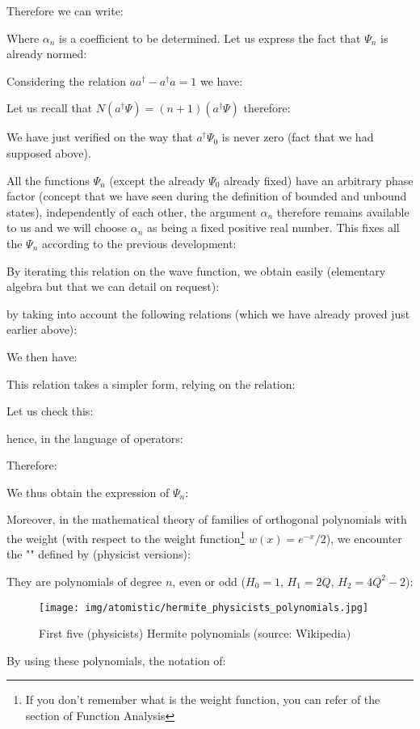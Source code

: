	Therefore we can write:
	
	Where $\alpha_n$ is a coefficient to be determined. Let us express the fact that $\Psi_n$ is already normed:
	
	Considering the relation $aa^\dagger-a^\dagger a=1$ we have:
	
	Let us recall that $N(a^\dagger\Psi)=(n+1)(a^\dagger\Psi)$ therefore:
	
	We have just verified on the way that $a^\dagger\Psi_0$ is never zero (fact that we had supposed above).

	All the functions $\Psi_n$ (except the already $\Psi_0$ already fixed) have an arbitrary phase factor (concept that we have seen during the definition of bounded and unbound states), independently of each other, the argument $\alpha_n$ therefore remains available to us and we will choose $\alpha_n$ as being a fixed positive real number. This fixes all the $\Psi_n$ according to the previous development:
	
	By iterating this relation on the wave function, we obtain easily (elementary algebra but that we can detail on request):
	
	by taking into account the following relations (which we have already proved just earlier above):
	
	We then have:
	
	This relation takes a simpler form, relying on the relation:
	
	Let us check this:
	
	hence, in the language of operators:
	
	Therefore:
	
	We thus obtain the expression of $\Psi_n$:
	
	Moreover, in the mathematical theory of families of orthogonal polynomials with the weight (with respect to the weight function\footnote{If you don't remember what is the weight function, you can refer of the section of Function Analysis} $w(x)=e^{-x}/2$), we encounter the "" defined by (physicist versions):
	
	They are polynomials of degree $n$, even or odd ($H_0=1$, $H_1=2Q$, $H_2=4Q^2-2$):
	\begin{figure}[H]
		\centering
		\texttt{[image: img/atomistic/hermite\_physicists\_polynomials.jpg]}	
		\caption[First five (physicists) Hermite polynomials]{First five (physicists) Hermite polynomials (source: Wikipedia)}
	\end{figure}
	By using these polynomials, the notation of:
	

